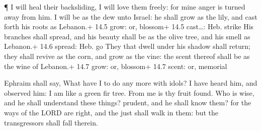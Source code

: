  ¶ I will heal their backsliding, I will love them freely:
for mine anger is turned away from him.  I will be as the
dew unto Israel: he shall grow as the lily, and cast forth his roots as
Lebanon.+ 14.5 grow: or, blossom+ 14.5 cast\ldots: Heb. strike
 His branches shall spread, and his beauty shall be as the
olive tree, and his smell as Lebanon.+ 14.6 spread: Heb. go 
They that dwell under his shadow shall return; they shall revive as the
corn, and grow as the vine: the scent thereof shall be as the wine of
Lebanon.+ 14.7 grow: or, blossom+ 14.7 scent: or, memorial

 Ephraim shall say, What have I to do any more with idols? I
have heard him, and observed him: I am like a green fir tree. From me is
thy fruit found.  Who is wise, and he shall understand these
things? prudent, and he shall know them? for the ways of the LORD are
right, and the just shall walk in them: but the transgressors shall fall
therein.

